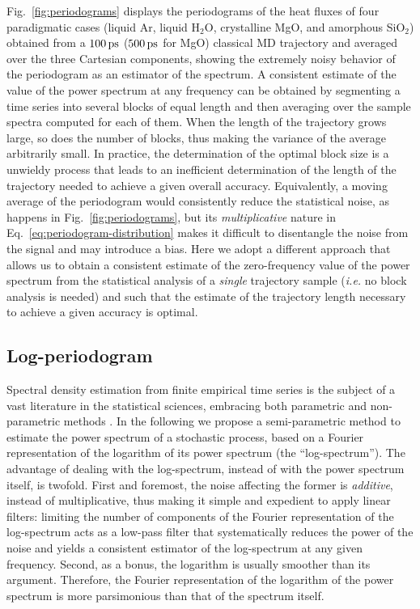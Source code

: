 Fig.~\ref{fig:periodograms} displays the periodograms of the heat fluxes of four paradigmatic cases (liquid Ar, liquid H$_2$O, crystalline MgO, and amorphous SiO$_2$) obtained from a $100\,\mathrm{ps}$ ($500\,\mathrm{ps}$ for MgO) classical MD trajectory and averaged over the three Cartesian components, showing the extremely noisy behavior of the periodogram as an estimator of the spectrum. 
A consistent estimate of the value of the power spectrum at any frequency can be obtained by segmenting a time series into several blocks of equal length and then averaging over the sample spectra computed for each of them. When the length of the trajectory grows large, so does the number of blocks, thus making the variance of the average arbitrarily small. In practice, the determination of the optimal block size is a unwieldy process that leads to an inefficient determination of the length of the trajectory needed to achieve a given overall accuracy. 
Equivalently, a moving average \cite{MovingAverage} of the periodogram would consistently reduce the statistical noise, as happens in Fig.~\ref{fig:periodograms}, but its \emph{multiplicative} nature in Eq.~\eqref{eq:periodogram-distribution} makes it difficult to disentangle the noise from the signal and may introduce a bias. 
Here we adopt a different approach that allows us to obtain a consistent estimate of the zero-frequency value of the power spectrum from the statistical analysis of a \emph{single} trajectory sample (\emph{i.e.} no block analysis is needed) and such that the estimate of the trajectory length necessary to achieve a given accuracy is optimal.

\subsection{Log-periodogram}
Spectral density estimation from finite empirical time series is the subject of a vast literature in the statistical sciences, embracing both parametric and non-parametric methods \cite{Stoica2005}. In the following we propose a semi-parametric method to estimate the power spectrum of a stochastic process, based on a Fourier representation of the logarithm of its power spectrum (the ``log-spectrum''). The advantage of dealing with the log-spectrum, instead of with the power spectrum itself, is twofold. First and foremost, the noise affecting the former is \emph{additive}, instead of multiplicative, thus making it simple and expedient to apply linear filters: limiting the number of components of the Fourier representation of the log-spectrum acts as a low-pass filter that systematically reduces the power of the noise and yields a consistent estimator of the log-spectrum at any given frequency. Second, as a bonus, the logarithm is usually smoother than its argument. Therefore, the Fourier representation of the logarithm of the power spectrum is more parsimonious than that of the spectrum itself.

